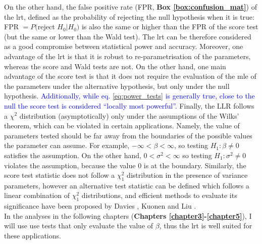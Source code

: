 On the other hand, the false positive rate (FPR, \textbf{Box \ref{box:confusion_mat}}) of the \gls{lrt}, defined as the probability of rejecting the null hypothesis when it is true: FPR $= P($reject $H_0 | H_0)$ is also the same or higher than the FPR of the score test (but the same or lower than the Wald test).
The \gls{lrt} can be therefore considered as a good compromise between statistical power and accuracy.
Moreover, one advantage of the \gls{lrt} is that it is robust to re-parametrisation of the parameters, whereas the score and Wald tests are not. 
On the other hand, one main 
advantage of the score test is that it does not require the evaluation of the \gls{mle} of the parameters under the alternative hypothesis, but only under the null hypothesis.
\textcolor{blue}{Additionally, while eq. \eqref{eq:power_tests} is generally true, close to the null the score test is considered “locally most powerful”.}
Finally, the $\mathrm{LLR}$ follows a $\chi^2$ distribution (asymptotically) only under the assumptions of the Wilks' theorem, which can be violated in certain applications.
Namely, the value of parameters tested should be far away from the boundaries of the possible values the parameter can assume.
For example, $-\infty < \beta < \infty$, so testing $H_1: \beta \neq 0$ satisfies the assumption.
On the other hand, $0 < \sigma^2 < \infty$ so testing $H_1: \sigma^2 \neq 0$ violates the assumption, because the value $0$ is at the boundary.
Similarly, the score test statistic does not follow a $\chi^2_1$ distribution in the presence of variance parameters, however an alternative test statistic can be defined which follows a linear combination of $\chi^2_1$ distributions, and efficient methods to evaluate its significance have been proposed by Davies \cite{davies1980algorithm}, Kuonen \cite{kuonen1999miscellanea} and Liu \cite{liu2009new, lee2012optimal}. \\

In the analyses in the following chapters (\textbf{Chapters \ref{chapter3}-\ref{chapter5}}), I will use use tests that only evaluate the value of $\beta$, thus the \gls{lrt} is well suited for these applications.


